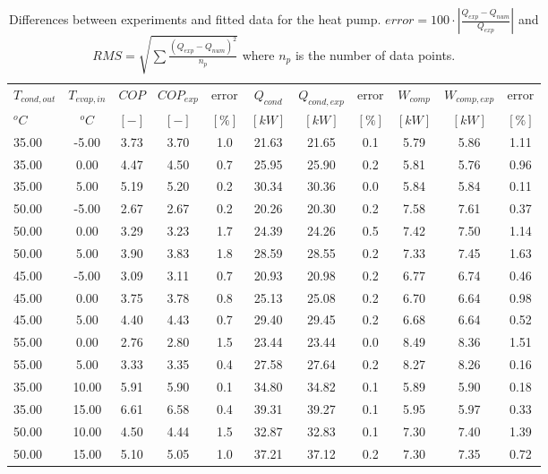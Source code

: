 \documentclass[english]{SPFShortReport}
\begin{document}
\begin{table}[!ht]
\begin{small}
\caption{Differences between experiments and fitted data for the heat pump.          $error=100 \cdot |\frac{Q_{exp}-Q_{num}}{Q_{exp}}|$ and $RMS = \sqrt { \sum{\frac{(Q_{exp}-Q_{num})^2}{n_p}} }$ where $n_p$ is the number of data points.}
\begin{center}
\resizebox{12cm}{!} 
{
\begin{tabular}{l | c c c c c c c c c c } 
\hline
\hline
$T_{cond,out}$ &$T_{evap,in}$ &$COP$ &$COP_{exp}$ &error &$Q_{cond}$ &$Q_{cond,exp}$ &error &$W_{comp}$ &$W_{comp,exp}$ &error \\ 
$^oC$ &$^oC$ &$[-]$ &$[-]$ &$[\%]$ &$[kW]$ &$[kW]$ &$[\%]$ &$[kW]$ &$[kW]$ &$[\%]$\\ 
\hline
35.00  & -5.00 & 3.73 & 3.70 & 1.0 & 21.63 & 21.65 & 0.1 & 5.79 & 5.86 & 1.11\\ 
35.00  & 0.00 & 4.47 & 4.50 & 0.7 & 25.95 & 25.90 & 0.2 & 5.81 & 5.76 & 0.96\\ 
35.00  & 5.00 & 5.19 & 5.20 & 0.2 & 30.34 & 30.36 & 0.0 & 5.84 & 5.84 & 0.11\\ 
50.00  & -5.00 & 2.67 & 2.67 & 0.2 & 20.26 & 20.30 & 0.2 & 7.58 & 7.61 & 0.37\\ 
50.00  & 0.00 & 3.29 & 3.23 & 1.7 & 24.39 & 24.26 & 0.5 & 7.42 & 7.50 & 1.14\\ 
50.00  & 5.00 & 3.90 & 3.83 & 1.8 & 28.59 & 28.55 & 0.2 & 7.33 & 7.45 & 1.63\\ 
45.00  & -5.00 & 3.09 & 3.11 & 0.7 & 20.93 & 20.98 & 0.2 & 6.77 & 6.74 & 0.46\\ 
45.00  & 0.00 & 3.75 & 3.78 & 0.8 & 25.13 & 25.08 & 0.2 & 6.70 & 6.64 & 0.98\\ 
45.00  & 5.00 & 4.40 & 4.43 & 0.7 & 29.40 & 29.45 & 0.2 & 6.68 & 6.64 & 0.52\\ 
55.00  & 0.00 & 2.76 & 2.80 & 1.5 & 23.44 & 23.44 & 0.0 & 8.49 & 8.36 & 1.51\\ 
55.00  & 5.00 & 3.33 & 3.35 & 0.4 & 27.58 & 27.64 & 0.2 & 8.27 & 8.26 & 0.16\\ 
35.00  & 10.00 & 5.91 & 5.90 & 0.1 & 34.80 & 34.82 & 0.1 & 5.89 & 5.90 & 0.18\\ 
35.00  & 15.00 & 6.61 & 6.58 & 0.4 & 39.31 & 39.27 & 0.1 & 5.95 & 5.97 & 0.33\\ 
50.00  & 10.00 & 4.50 & 4.44 & 1.5 & 32.87 & 32.83 & 0.1 & 7.30 & 7.40 & 1.39\\ 
50.00  & 15.00 & 5.10 & 5.05 & 1.0 & 37.21 & 37.12 & 0.2 & 7.30 & 7.35 & 0.72\\ 

\end{tabular}}
\end{center}
\end{small}
\end{table}
\end{document}
